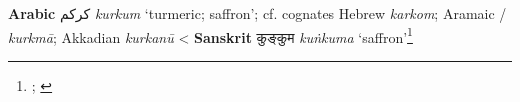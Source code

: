 \begin{etymology}\label{ety:kurkum}
\textbf{Arabic} {كركم} \textit{kurkum} `turmeric; saffron'; cf. cognates Hebrew  \textit{karkom}; Aramaic / \textit{kurkmā}; Akkadian  \textit{kurkanū}
< \textbf{Sanskrit} {कुङ्कुम } \textit{kuṅkuma} `saffron'\footnote{\textcite[s.v. kwrkm]{cal}; \textcite{guthrie_trade-language_2009}}
\end{etymology}